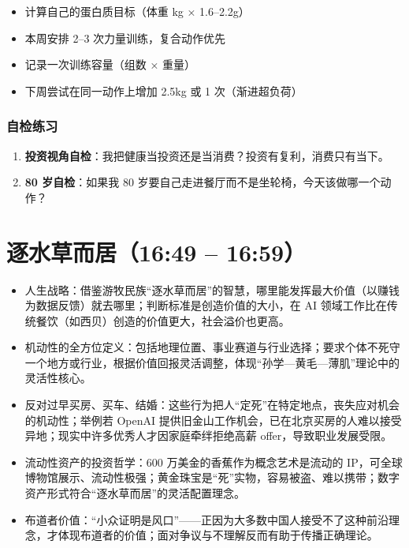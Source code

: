 \begin{itemize}
\tightlist
\item[$\square$]
  计算自己的蛋白质目标（体重 kg × 1.6--2.2g）
\item[$\square$]
  本周安排 2--3 次力量训练，复合动作优先
\item[$\square$]
  记录一次训练容量（组数 × 重量）
\item[$\square$]
  下周尝试在同一动作上增加 2.5kg 或 1 次（渐进超负荷）
\end{itemize}

\subsubsection{自检练习}

\begin{enumerate}
\def\labelenumi{\arabic{enumi}.}
\tightlist
\item
  \textbf{投资视角自检}：我把健康当投资还是当消费？投资有复利，消费只有当下。
\item
  \textbf{80 岁自检}：如果我 80
  岁要自己走进餐厅而不是坐轮椅，今天该做哪一个动作？
\end{enumerate}

\section{逐水草而居（16:49 --
16:59）}

\begin{itemize}
\tightlist
\item
  人生战略：借鉴游牧民族``逐水草而居''的智慧，哪里能发挥最大价值（以赚钱为数据反馈）就去哪里；判断标准是创造价值的大小，在
  AI 领域工作比在传统餐饮（如西贝）创造的价值更大，社会溢价也更高。
\item
  机动性的全方位定义：包括地理位置、事业赛道与行业选择；要求个体不死守一个地方或行业，根据价值回报灵活调整，体现``孙学---黄毛---薄肌''理论中的灵活性核心。
\item
  反对过早买房、买车、结婚：这些行为把人``定死''在特定地点，丧失应对机会的机动性；举例若
  OpenAI
  提供旧金山工作机会，已在北京买房的人难以接受异地；现实中许多优秀人才因家庭牵绊拒绝高薪
  offer，导致职业发展受限。
\item
  流动性资产的投资哲学：600 万美金的香蕉作为概念艺术是流动的
  IP，可全球博物馆展示、流动性极强；黄金珠宝是``死''实物，容易被盗、难以携带；数字资产形式符合``逐水草而居''的灵活配置理念。
\item
  布道者价值：``小众证明是风口''------正因为大多数中国人接受不了这种前沿理念，才体现布道者的价值；面对争议与不理解反而有助于传播正确理论。
\end{itemize}

